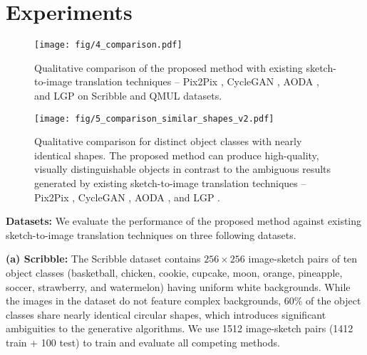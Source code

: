 \section{Experiments}
\label{sec:experiments}

\begin{figure}[t]
  \centering
  \texttt{[image: fig/4\_comparison.pdf]}
  \caption{Qualitative comparison of the proposed method with existing sketch-to-image translation techniques -- Pix2Pix \cite{isola2017image}, CycleGAN \cite{zhu2017unpaired}, AODA \cite{xiang2022adversarial}, and LGP \cite{voynov2023sketch} on Scribble \cite{ghosh2019interactive} and QMUL \cite{song2017deep,yu2016sketch} datasets.}
  \label{fig:comparison}
  \vspace{-0.5em}
\end{figure}

\begin{figure}[t]
  \centering
  \texttt{[image: fig/5\_comparison\_similar\_shapes\_v2.pdf]}
  \caption{Qualitative comparison for distinct object classes with nearly identical shapes. The proposed method can produce high-quality, visually distinguishable objects in contrast to the ambiguous results generated by existing sketch-to-image translation techniques -- Pix2Pix \cite{isola2017image}, CycleGAN \cite{zhu2017unpaired}, AODA \cite{xiang2022adversarial}, and LGP \cite{voynov2023sketch}.}
  \label{fig:comparison_similar_shapes}
  \vspace{-0.5em}
\end{figure}

\noindent
\textbf{Datasets:} We evaluate the performance of the proposed method against existing sketch-to-image translation techniques \cite{isola2017image,voynov2023sketch,xiang2022adversarial,zhu2017unpaired} on three following datasets.

\vspace{0.5em}

\noindent
\textbf{(a) Scribble:} The Scribble dataset \cite{ghosh2019interactive} contains $256 \times 256$ image-sketch pairs of ten object classes (basketball, chicken, cookie, cupcake, moon, orange, pineapple, soccer, strawberry, and watermelon) having uniform white backgrounds. While the images in the dataset do not feature complex backgrounds, 60\% of the object classes share nearly identical circular shapes, which introduces significant ambiguities to the generative algorithms. We use 1512 image-sketch pairs \cite{xiang2022adversarial} (1412 train + 100 test) to train and evaluate all competing methods.

